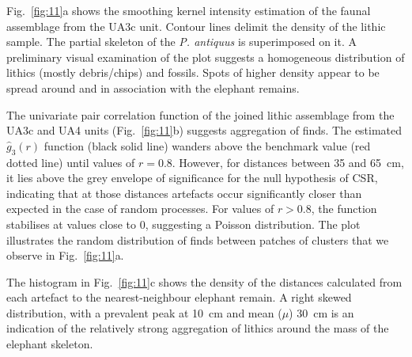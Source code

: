 \documentclass[preprint,authoryear,times]{elsarticle} %
\begin{document}
Fig.~\ref{fig:11}a shows the smoothing kernel intensity estimation of the faunal assemblage from the UA3c unit. Contour lines delimit the density of the lithic sample. The partial skeleton of the \emph{P. antiquus} is superimposed on it. A preliminary visual examination of the plot suggests a homogeneous distribution of lithics (mostly debris/chips) and fossils. Spots of higher density appear to be spread around and in association with the elephant remains.

The univariate pair correlation function of the joined lithic assemblage from the UA3c and UA4 units (Fig.~\ref{fig:11}b) suggests aggregation of finds. The estimated $\hat{g}_3(r)$ function (black solid line) wanders above the benchmark value (red dotted line) until values of $r=0.8$. However, for distances between 35 and 65~cm, it lies above the grey envelope of significance for the null hypothesis of CSR, indicating that at those distances artefacts occur significantly closer than expected in the case of random processes. For values of $r>0.8$, the function stabilises at values close to 0, suggesting a Poisson distribution. The plot illustrates the random distribution of finds between patches of clusters that we observe in Fig.~\ref{fig:11}a.

The histogram in Fig.~\ref{fig:11}c shows the density of the distances calculated from each artefact to the nearest-neighbour elephant remain. A right skewed distribution, with a prevalent peak at 10~cm and mean ($\mu$) 30~cm is an indication of the relatively strong aggregation of lithics around the mass of the elephant skeleton.
\end{document}
